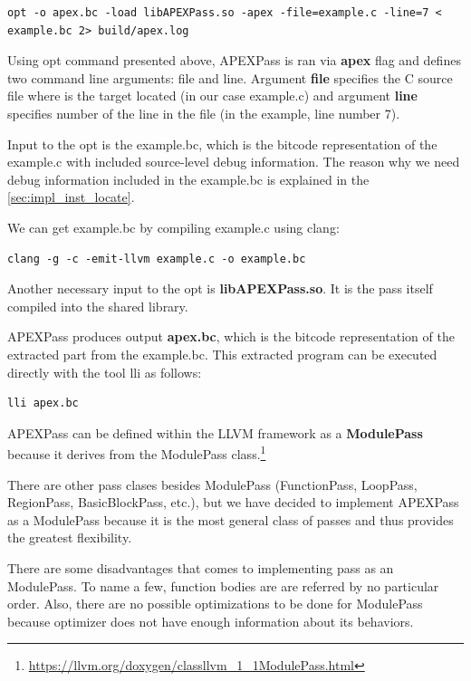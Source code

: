 \documentclass[12pt, twoside]{fithesis2}
\renewcommand{\_}{\leavevmode \kern0.07em\vbox{\hrule width0.4em}}
\begin{document}
\begin{verbatim}
opt -o apex.bc -load libAPEXPass.so -apex -file=example.c -line=7 < example.bc 2> build/apex.log
\end{verbatim}

Using opt command presented above, APEXPass is ran via \textbf{apex} flag and defines
two command line arguments: file and line.
Argument \textbf{file} specifies the C source file where is the target located
(in our case example.c) and argument \textbf{line} specifies number of the line
in the file (in the example, line number 7).

Input to the opt is the example.bc, which is the bitcode representation of the
example.c with included source-level debug information. The reason why we need
debug information included in the example.bc is explained in the
\autoref{sec:impl_inst_locate}.

We can get example.bc by compiling example.c using clang:

\begin{verbatim}
clang -g -c -emit-llvm example.c -o example.bc
\end{verbatim}

Another necessary input to the opt is \textbf{libAPEXPass.so}. It is the pass
itself compiled into the shared library.

APEXPass produces output \textbf{apex.bc}, which is the bitcode representation
of the extracted part from the example.bc.
This extracted program can be executed directly with the tool lli as follows:

\begin{verbatim}
lli apex.bc
\end{verbatim}

APEXPass can be defined within the LLVM framework as a \textbf{ModulePass}
because it derives from the ModulePass class.\footnote{
\url{https://llvm.org/doxygen/classllvm_1_1ModulePass.html}
}

There are other pass clases besides ModulePass (FunctionPass, LoopPass,
RegionPass, BasicBlockPass, etc.), but we have decided to implement APEXPass as
a ModulePass because it is the most general class of passes and thus provides
the greatest flexibility.

There are some disadvantages that comes to implementing pass as an ModulePass.
To name a few, function bodies are are referred by no particular order.
Also, there are no possible
optimizations to be done for ModulePass because optimizer does not have enough
information about its behaviors. \cite{llvm-module-pass}
\end{document}
